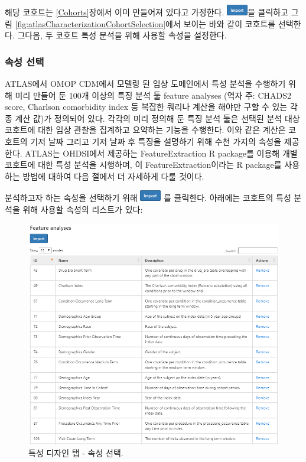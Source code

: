 \documentclass[10.5pt]{book}
\theoremstyle{definition}
\theoremstyle{definition}
\theoremstyle{definition}
\theoremstyle{remark}
\begin{document}
해당 코호트는 \ref{Cohorts}장에서 이미 만들어져 있다고 가정한다.
\includegraphics{images/Characterization/atlasImportButton.png}을
클릭하고 그림 \ref{fig:atlasCharacterizationCohortSelection}에서 보이는
바와 같이 코호트를 선택한다. 그다음, 두 코호트 특성 분석을 위해 사용할
속성을 설정한다.

\subsubsection*{속성 선택}\label{-}

ATLAS에서 OMOP CDM에서 모델링 된 임상 도메인에서 특성 분석을 수행하기
위해 미리 만들어 둔 100개 이상의 특징 분석 툴 feature analyses (역자 주:
CHADS2 score, Charlson comorbidity index 등 복잡한 쿼리나 계산을 해야만
구할 수 있는 각종 계산 값)가 정의되어 있다. 각각의 미리 정의해 둔 특징
분석 툴은 선택된 분석 대상 코호트에 대한 임상 관찰을 집계하고 요약하는
기능을 수행한다. 이와 같은 계산은 코호트의 기저 날짜 그리고 기저 날짜 후
특징을 설명하기 위해 수천 가지의 속성을 제공한다. ATLAS는 OHDSI에서
제공하는 FeatureExtraction R package를 이용해 개별 코호트에 대한 특성
분석을 시행하며, 이 FeatureExtraction이라는 R package를 사용하는 방법에
대하여 다음 절에서 더 자세하게 다룰 것이다. 

분석하고자 하는 속성을 선택하기 위해
\includegraphics{images/Characterization/atlasImportButton.png} 를
클릭한다. 아래에는 코호트의 특성 분석을 위해 사용할 속성의 리스트가
있다:

\begin{figure}

{\centering \includegraphics[width=1\linewidth]{images/Characterization/atlasCharacterizationFeatureSelection} 

}

\caption{특성 디자인 탭 - 속성 선택.}\label{fig:atlasCharacterizationFeatureSelection}
\end{figure}
\end{document}
